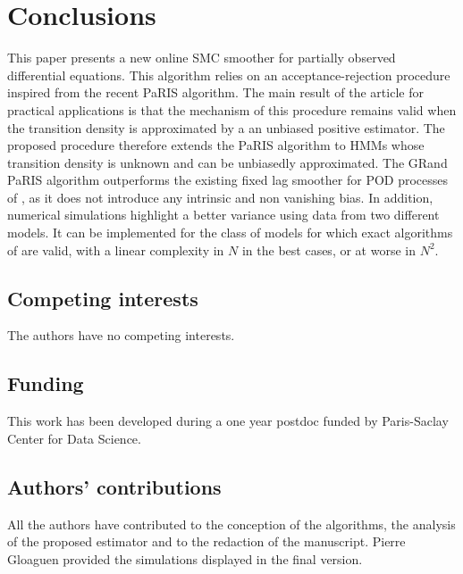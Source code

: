 \documentclass[12pt]{article}
\newcommand{\1}{\mathrm{1}}
\begin{document}
\section{Conclusions}
This paper presents a new online SMC smoother for partially observed differential equations.
 This algorithm relies on an acceptance-rejection procedure inspired from the recent PaRIS algorithm.
 The main result of the article for practical applications is that the mechanism of this procedure remains valid when the transition density is approximated by a an unbiased positive estimator.
  The proposed procedure therefore extends the PaRIS algorithm to HMMs whose transition density is unknown and can be unbiasedly approximated. The GRand PaRIS algorithm outperforms the existing fixed lag smoother for POD processes of \cite{olsson:strojby:2011}, as it does not introduce any intrinsic and non vanishing bias.
   In addition, numerical simulations highlight a better variance using data from two different models.
   It can be implemented for the class of models for which exact algorithms of \cite{beskos:papaspiliopoulos:roberts:fearnhead:2006} are valid, with a linear complexity in $N$ in the best cases, or at worse in $N^2$. 

\subsection*{Competing interests}
The authors have no competing interests. 

\subsection*{Funding}
This work has been developed during a one year postdoc funded by Paris-Saclay Center for Data Science. 

\subsection*{Authors' contributions}
All the authors have contributed to the conception of the algorithms, the analysis of the proposed estimator and to the redaction of the manuscript.
 Pierre Gloaguen provided the simulations displayed in the final version. 

\appendix
\end{document}
